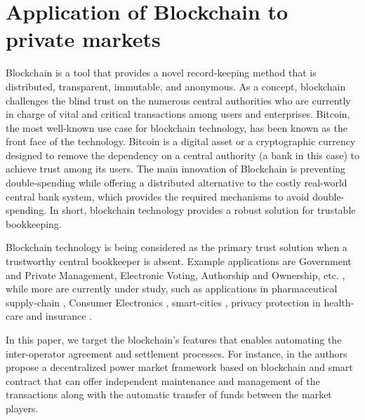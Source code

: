 \documentclass[conference]{IEEEtran}
\begin{document}
\section{Application of Blockchain to private markets}
Blockchain is a tool that provides a novel record-keeping method that is distributed, transparent, immutable, and anonymous. As a concept, blockchain challenges the blind trust on the numerous central authorities who are currently in charge of vital and critical transactions among users and enterprises. 
Bitcoin, the most well-known use case for blockchain technology, has been known as the front face of the technology. Bitcoin is a digital asset or a cryptographic currency designed to remove the dependency on a central authority (a bank in this case) to achieve trust among its users.
The main innovation of  Blockchain is preventing double-spending while offering a distributed alternative to the costly real-world central bank system, which provides the required mechanisms to avoid double-spending. In short, blockchain technology provides a robust solution for trustable bookkeeping.


Blockchain technology is being considered as the primary trust solution when a trustworthy central bookkeeper is absent. Example applications are Government and Private Management, Electronic Voting, Authorship and Ownership, etc. \cite{8552978}, while more are currently under study, such as applications in pharmaceutical supply-chain \cite{7987376}, Consumer Electronics \cite{8386955}, smart-cities \cite{8386958}, privacy protection in health-care \cite{8386918} and insurance \cite{8386868}. %


In this paper, we target the blockchain's features that enables automating the inter-operator agreement and settlement processes. For instance, in \cite{8368442} the authors propose a decentralized power market framework based on blockchain and smart contract that can offer independent maintenance and management of the transactions along with the automatic transfer of funds between the market players.
\end{document}
